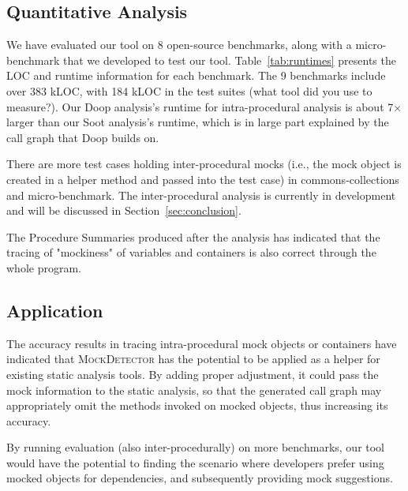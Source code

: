\subsection{Quantitative Analysis}
\label{subsec:effectiveness}

We have evaluated our tool on 8 open-source benchmarks, along with a micro-benchmark that we developed to test our tool. Table~\ref{tab:runtimes} presents the LOC and runtime information for each benchmark. The 9 benchmarks include over 383 kLOC, with 184 kLOC in the test suites (what tool did you use to measure?). Our Doop analysis's runtime for intra-procedural analysis is about 7$\times$ larger than our Soot analysis's runtime, which is in large part explained by the call graph that Doop builds on.


There are more test cases holding inter-procedural mocks (i.e., the mock object is created in a helper method and passed into the test case) in commons-collections and micro-benchmark. The inter-procedural analysis is currently in development and will be discussed in Section~\ref{sec:conclusion}.

The Procedure Summaries produced after the analysis has indicated that the tracing of "mockiness" of variables and containers is also correct through the whole program. 

\subsection{Application}
\label{subsec:static}

The accuracy results in tracing intra-procedural mock objects or containers have indicated that \textsc{MockDetector} has the potential to be applied as a helper for existing static analysis tools. By adding proper adjustment, it could pass the mock information to the static analysis, so that the generated call graph may appropriately omit the methods invoked on mocked objects, thus increasing its accuracy.

By running evaluation (also inter-procedurally) on more benchmarks, our tool would have the potential to finding the scenario where developers prefer using mocked objects for dependencies, and subsequently providing mock suggestions.
